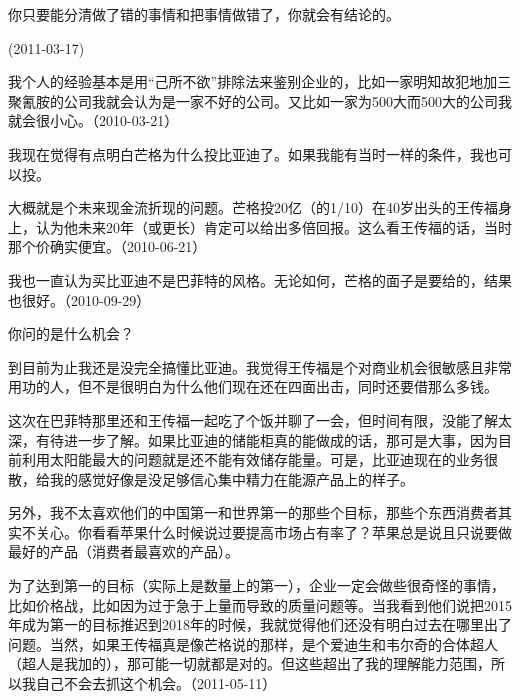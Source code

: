
你只要能分清做了错的事情和把事情做错了，你就会有结论的。

(2011-03-17)


我个人的经验基本是用“己所不欲”排除法来鉴别企业的，比如一家明知故犯地加三聚氰胺的公司我就会认为是一家不好的公司。又比如一家为500大而500大的公司我就会很小心。（2010-03-21）



我现在觉得有点明白芒格为什么投比亚迪了。如果我能有当时一样的条件，我也可以投。

大概就是个未来现金流折现的问题。芒格投20亿（的1/10）在40岁出头的王传福身上，认为他未来20年（或更长）肯定可以给出多倍回报。这么看王传福的话，当时那个价确实便宜。（2010-06-21）


我也一直认为买比亚迪不是巴菲特的风格。无论如何，芒格的面子是要给的，结果也很好。（2010-09-29）


你问的是什么机会？

到目前为止我还是没完全搞懂比亚迪。我觉得王传福是个对商业机会很敏感且非常用功的人，但不是很明白为什么他们现在还在四面出击，同时还要借那么多钱。

这次在巴菲特那里还和王传福一起吃了个饭并聊了一会，但时间有限，没能了解太深，有待进一步了解。如果比亚迪的储能柜真的能做成的话，那可是大事，因为目前利用太阳能最大的问题就是还不能有效储存能量。可是，比亚迪现在的业务很散，给我的感觉好像是没足够信心集中精力在能源产品上的样子。

另外，我不太喜欢他们的中国第一和世界第一的那些个目标，那些个东西消费者其实不关心。你看看苹果什么时候说过要提高市场占有率了？苹果总是说且只说要做最好的产品（消费者最喜欢的产品）。

为了达到第一的目标（实际上是数量上的第一），企业一定会做些很奇怪的事情，比如价格战，比如因为过于急于上量而导致的质量问题等。当我看到他们说把2015年成为第一的目标推迟到2018年的时候，我就觉得他们还没有明白过去在哪里出了问题。当然，如果王传福真是像芒格说的那样，是个爱迪生和韦尔奇的合体超人（超人是我加的），那可能一切就都是对的。但这些超出了我的理解能力范围，所以我自己不会去抓这个机会。（2011-05-11）

